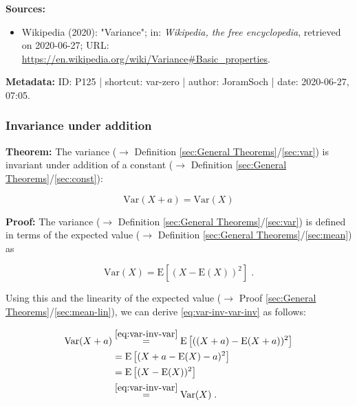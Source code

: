 \documentclass[a4paper,12pt,twoside]{book}
\begin{document}
\vspace{1em}
\textbf{Sources:}
\begin{itemize}
\item Wikipedia (2020): "Variance"; in: \textit{Wikipedia, the free encyclopedia}, retrieved on 2020-06-27; URL: \url{https://en.wikipedia.org/wiki/Variance#Basic_properties}.
\end{itemize}


\vspace{1em}
\textbf{Metadata:} ID: P125 | shortcut: var-zero | author: JoramSoch | date: 2020-06-27, 07:05.
\vspace{1em}



\subsubsection[\textbf{Invariance under addition}]{Invariance under addition} \label{sec:var-inv}
\setcounter{equation}{0}

\textbf{Theorem:} The variance ($\rightarrow$ Definition \ref{sec:General Theorems}/\ref{sec:var}) is invariant under addition of a constant ($\rightarrow$ Definition \ref{sec:General Theorems}/\ref{sec:const}):

\begin{equation} \label{eq:var-inv-var-inv}
\mathrm{Var}(X+a) = \mathrm{Var}(X)
\end{equation}


\vspace{1em}
\textbf{Proof:} The variance ($\rightarrow$ Definition \ref{sec:General Theorems}/\ref{sec:var}) is defined in terms of the expected value ($\rightarrow$ Definition \ref{sec:General Theorems}/\ref{sec:mean}) as

\begin{equation} \label{eq:var-inv-var}
\mathrm{Var}(X) = \mathrm{E}\left[ (X-\mathrm{E}(X))^2 \right] \; .
\end{equation}

Using this and the linearity of the expected value ($\rightarrow$ Proof \ref{sec:General Theorems}/\ref{sec:mean-lin}), we can derive \eqref{eq:var-inv-var-inv} as follows:

\begin{equation} \label{eq:var-inv-var-inv-qed}
\begin{split}
\mathrm{Var}(X+a) &\overset{\eqref{eq:var-inv-var}}{=} \mathrm{E}\left[ ((X+a)-\mathrm{E}(X+a))^2 \right] \\
&= \mathrm{E}\left[ (X + a - \mathrm{E}(X) - a)^2 \right] \\
&= \mathrm{E}\left[ (X-\mathrm{E}(X))^2 \right] \\
&\overset{\eqref{eq:var-inv-var}}{=} \mathrm{Var}(X) \; . \\
\end{split}
\end{equation}
\end{document}

